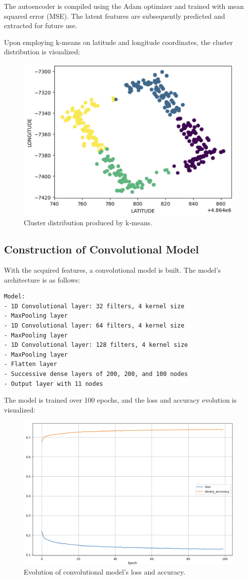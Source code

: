 \documentclass[conference]{IEEEtran}
\begin{document}
The autoencoder is compiled using the Adam optimizer and trained with mean squared error (MSE). The latent features are subsequently predicted and extracted for future use.

Upon employing k-means on latitude and longitude coordinates, the cluster distribution is visualized:

\begin{figure}[h]
\centering
\includegraphics[width=0.5\linewidth]{imageau1.png}
\caption{Cluster distribution produced by k-means.}
\end{figure}

\subsection{Construction of Convolutional Model}

With the acquired features, a convolutional model is built. The model's architecture is as follows:

\begin{lstlisting}
Model:
- 1D Convolutional layer: 32 filters, 4 kernel size
- MaxPooling layer
- 1D Convolutional layer: 64 filters, 4 kernel size
- MaxPooling layer
- 1D Convolutional layer: 128 filters, 4 kernel size
- MaxPooling layer
- Flatten layer
- Successive dense layers of 200, 200, and 100 nodes
- Output layer with 11 nodes
\end{lstlisting}

The model is trained over 100 epochs, and the loss and accuracy evolution is visualized:

\begin{figure}[h]
\centering
\includegraphics[width=0.5\linewidth]{imageau2.png}
\caption{Evolution of convolutional model's loss and accuracy.}
\end{figure}
\end{document}
